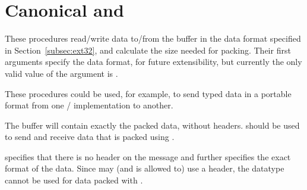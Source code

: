 \section{Canonical \texorpdfstring{}{MPI\_PACK} and \texorpdfstring{}{MPI\_UNPACK}}
\label{canonical_pack}

These procedures read/write data to/from the buffer in the
 data
format specified in Section~\ref{subsec:ext32}, and calculate the size needed
for packing.  Their first arguments specify the data format, for future
extensibility, but
currently
the only valid value of the 
argument is .
\begin{users}
  These procedures could be used, for example, to send typed data in a portable
  format from one \MPI/ implementation to another.
\end{users}

The buffer will contain exactly the packed data, without headers.
 should be used to send and receive data that is packed
using .

\begin{rationale}
 specifies that there is no header on the message
and further
specifies the exact format of the data.  Since  may (and is
allowed
to) use a header, the datatype  cannot be used for data
packed with
.
\end{rationale}


